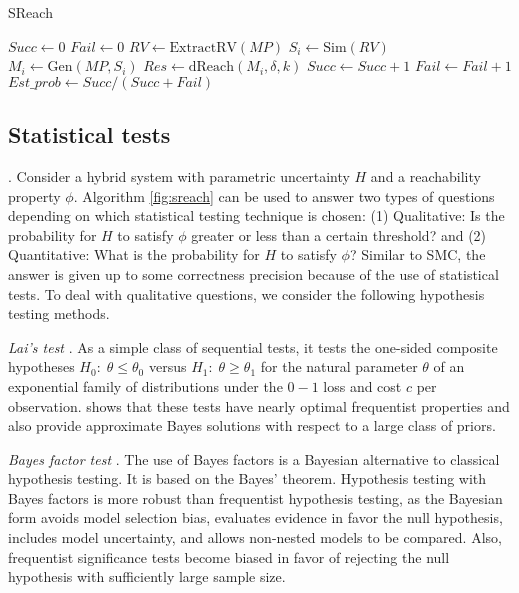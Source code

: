 \begin{algorithm}
  \centering
  \caption{SReach}
  \label{fig:sreach}
  \begin{algorithmic}[1]
        \State $Succ \gets 0$
        \State $Fail \gets 0$
        \State $RV \gets \mathrm{ExtractRV}(MP)$
        \Repeat
        	   \State $S_i \gets \mathrm{Sim}(RV)$
            \State $M_i \gets \mathrm{Gen}(MP, S_i)$
            \State $Res \gets \mathrm{dReach}(M_i, \delta, k)$
		\State $Succ \gets Succ + 1$
	  \Else
		\State $Fail \gets Fail + 1$
	  \EndIf
        \State $Est\_prob \gets Succ / (Succ + Fail)$
   \EndProcedure
  \end{algorithmic}
\end{algorithm}

\subsection{Statistical tests}.
Consider a hybrid system with parametric uncertainty $H$ and a reachability property $\phi$. Algorithm \ref{fig:sreach} can be used to answer two types of questions depending on which statistical testing technique is chosen: (1) Qualitative: Is the probability for $H$ to satisfy $\phi$ greater or less than a certain threshold? and
(2) Quantitative: What is the probability for $H$ to satisfy $\phi$? Similar to SMC, the answer is given up to some correctness precision because of the use of statistical tests.  To deal with qualitative questions, we consider the following hypothesis testing methods.

\textit{Lai's test} \cite{lai1988nearly}.
As a simple class of sequential tests, it tests the one-sided composite hypotheses $H_0: \; \theta \leq \theta_0$ versus $H_1:\; \theta \geq \theta_1$ for the natural parameter $\theta$ of an exponential family of distributions under the $0-1$ loss and cost $c$ per observation. \cite{lai1988nearly} shows that these tests have nearly optimal frequentist properties and also provide approximate Bayes solutions with respect to a large class of priors. 

\textit{Bayes factor test} \cite{kass1995bayes}.
The use of Bayes factors is a Bayesian alternative to classical hypothesis testing. It is based on the Bayes' theorem. Hypothesis testing with Bayes factors is more robust than frequentist hypothesis testing, as the Bayesian form avoids model selection bias, evaluates evidence in favor the null hypothesis, includes model uncertainty, and allows non-nested models to be compared. Also, frequentist significance tests become biased in favor of rejecting the null hypothesis with sufficiently large sample size. 

